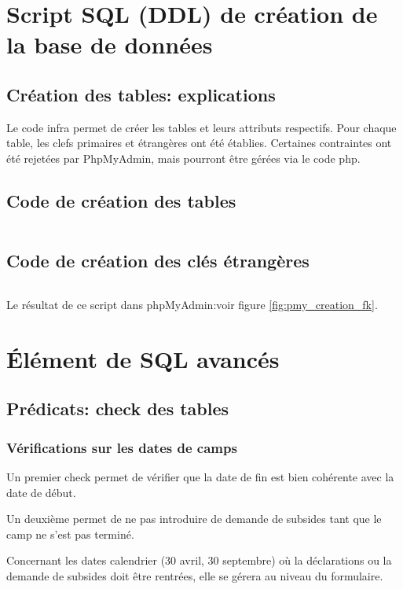 \section{Script SQL (DDL) de création de la base de données}
\subsection{Création des tables: explications}
Le code infra permet de créer les tables et leurs attributs respectifs. Pour chaque table, les clefs primaires et étrangères ont été établies. Certaines contraintes ont été rejetées par PhpMyAdmin, mais pourront être gérées via le code php.

\subsection{Code de création des tables}
\inputminted[breaklines =true, autogobble, linenos, frame = single]{sql}{Codes/code_creation.tex}

\subsection{Code de création des clés étrangères}
\inputminted[breaklines =true, autogobble, linenos, frame = single]{sql}{Codes/code_key.tex}

Le résultat de ce script dans phpMyAdmin:voir figure \ref{fig:pmy_creation_fk}.


\section{Élément de SQL avancés}
\subsection{Prédicats: check des tables}
\subsubsection{Vérifications sur les dates de camps}
Un premier check permet de vérifier que la date de fin est bien cohérente avec la date de début.


Un deuxième permet de ne pas introduire de demande de subsides tant que le camp ne s'est pas terminé. 



Concernant les dates calendrier (30 avril, 30 septembre) où la déclarations ou la demande de subsides doit être rentrées, elle se gérera au niveau du formulaire. 

